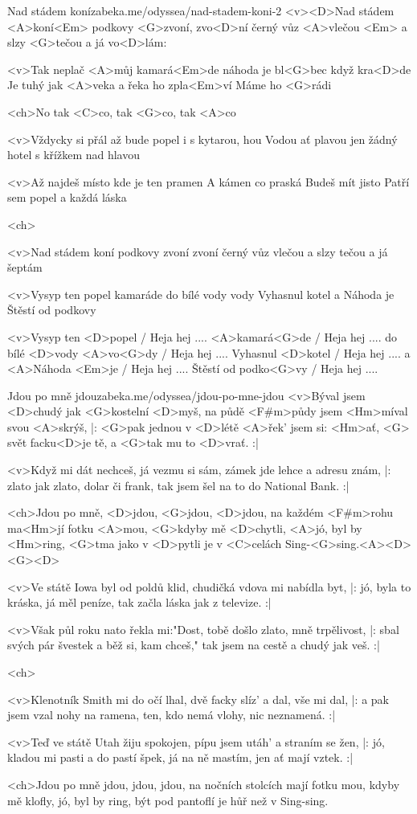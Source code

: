 \begin{song}[Buty]{33}{Nad stádem koní}{zabeka.me/odyssea/nad-stadem-koni-2}
	<v><D>Nad stádem <A>koní<Em>
	podkovy <G>zvoní, zvo<D>ní
	černý vůz <A>vlečou <Em>
	a slzy <G>tečou a já vo<D>lám:

	<v>Tak neplač <A>můj kamará<Em>de
	náhoda je bl<G>bec když kra<D>de
	Je tuhý jak <A>veka
	a řeka ho zpla<Em>ví
	Máme ho <G>rádi

	<ch>No tak <C>co, tak <G>co, tak <A>co

	<v>Vždycky si přál
	až bude popel
	i s kytarou, hou
	Vodou ať plavou
	jen žádný hotel
	s křížkem nad hlavou

	<v>Až najdeš místo
	kde je ten pramen
	A kámen co praská
	Budeš mít jisto
	Patří sem popel
	a každá láska

	<ch>

	<v>Nad stádem koní
	podkovy zvoní zvoní
	černý vůz vlečou
	a slzy tečou
	a já šeptám

	<v>Vysyp ten popel
	kamaráde
	do bílé vody vody
	Vyhasnul kotel
	a Náhoda
	je Štěstí od podkovy

	<v>Vysyp ten <D>popel / Heja hej ....
	<A>kamará<G>de / Heja hej ....
	do bílé <D>vody <A>vo<G>dy / Heja hej ....
	Vyhasnul <D>kotel / Heja hej ....
	a <A>Náhoda <Em>je / Heja hej ....
	Štěstí od podko<G>vy / Heja hej ....
\end{song}
\begin{song}{34}{Jdou po mně jdou}{zabeka.me/odyssea/jdou-po-mne-jdou}
	<v>Býval jsem <D>chudý jak <G>kostelní <D>myš,
	na půdě <F#m>půdy jsem <Hm>míval svou <A>skrýš,
	|: <G>pak jednou v <D>létě <A>řek' jsem si: <Hm>ať,
	<G> svět facku<D>je tě, a <G>tak mu to <D>vrať. :|

	<v>Když mi dát nechceš, já vezmu si sám,
	zámek jde lehce a adresu znám,
	|: zlato jak zlato, dolar či frank,
	tak jsem šel na to do National Bank. :|

	<ch>Jdou po mně, <D>jdou, <G>jdou, <D>jdou,
	na každém <F#m>rohu ma<Hm>jí fotku <A>mou,
	<G>kdyby mě <D>chytli, <A>jó, byl by <Hm>ring,
	<G>tma jako v <D>pytli je v <C>celách Sing-<G>sing.<A><D> <G><D>

	<v>Ve státě Iowa byl od poldů klid,
	chudičká vdova mi nabídla byt,
	|: jó, byla to kráska, já měl peníze,
	tak začla láska jak z televize. :|

	<v>Však půl roku nato řekla mi:"Dost,
	tobě došlo zlato, mně trpělivost,
	|: sbal svých pár švestek a běž si, kam chceš,"
	tak jsem na cestě a chudý jak veš. :|

	<ch>

	<v>Klenotník Smith mi do očí lhal,
	dvě facky slíz' a dal, vše mi dal,
	|: a pak jsem vzal nohy na ramena,
	ten, kdo nemá vlohy, nic neznamená. :|

	<v>Teď ve státě Utah žiju spokojen,
	pípu jsem utáh' a straním se žen,
	|: jó, kladou mi pasti a do pastí špek,
	já na ně mastím, jen ať mají vztek. :|

	<ch>Jdou po mně jdou, jdou, jdou,
	na nočních stolcích mají fotku mou,
	kdyby mě klofly, jó, byl by ring,
	být pod pantoflí je hůř než v Sing-sing.
\end{song}
